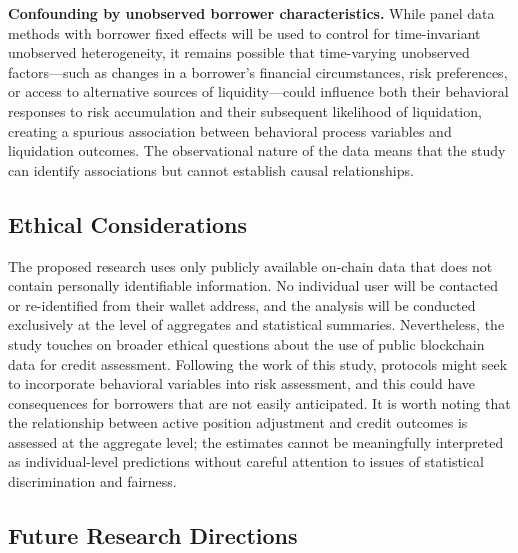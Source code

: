 \textbf{Confounding by unobserved borrower characteristics.} While panel data methods with borrower fixed effects will be used to control for time-invariant unobserved heterogeneity, it remains possible that time-varying unobserved factors—such as changes in a borrower's financial circumstances, risk preferences, or access to alternative sources of liquidity—could influence both their behavioral responses to risk accumulation and their subsequent likelihood of liquidation, creating a spurious association between behavioral process variables and liquidation outcomes. The observational nature of the data means that the study can identify associations but cannot establish causal relationships.

\subsection{Ethical Considerations}

The proposed research uses only publicly available on-chain data that does not contain personally identifiable information. No individual user will be contacted or re-identified from their wallet address, and the analysis will be conducted exclusively at the level of aggregates and statistical summaries. Nevertheless, the study touches on broader ethical questions about the use of public blockchain data for credit assessment. Following the work of this study, protocols might seek to incorporate behavioral variables into risk assessment, and this could have consequences for borrowers that are not easily anticipated. It is worth noting that the relationship between active position adjustment and credit outcomes is assessed at the aggregate level; the estimates cannot be meaningfully interpreted as individual-level predictions without careful attention to issues of statistical discrimination and fairness.

\subsection{Future Research Directions}

